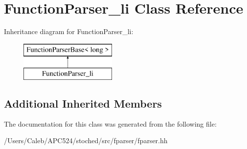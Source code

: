 \hypertarget{class_function_parser__li}{}\section{Function\+Parser\+\_\+li Class Reference}
\label{class_function_parser__li}
Inheritance diagram for Function\+Parser\+\_\+li\+:\begin{figure}[H]
\begin{center}
\leavevmode
\includegraphics[height=2.000000cm]{class_function_parser__li}
\end{center}
\end{figure}
\subsection*{Additional Inherited Members}


The documentation for this class was generated from the following file\+:\begin{DoxyCompactItemize}
\item 
/\+Users/\+Caleb/\+A\+P\+C524/stoched/src/fparser/fparser.\+hh\end{DoxyCompactItemize}
